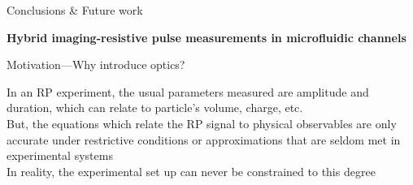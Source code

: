 \begin{frame}[c]{Conclusions \& Future work}

      

\end{frame}





\begin{frame}[c]{}
	\begin{center}
		\textbf{Hybrid imaging-resistive pulse measurements in microfluidic channels}
	\end{center}
\end{frame}





\begin{frame}[c]{Motivation---Why introduce optics?}
	
	In an RP experiment, the usual parameters measured are amplitude and duration, which can relate to particle's volume, charge, etc. \\
	\vspace{.3in}
	But, the equations which relate the RP signal to physical observables are only accurate under restrictive conditions or approximations that are seldom met in experimental systems \\
	\vspace{.3in}
 	In reality, the experimental set up can never be constrained to this degree \\
 	

\end{frame}



